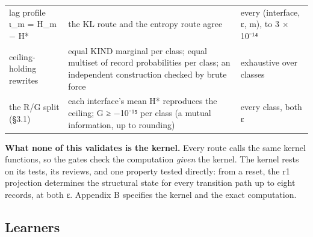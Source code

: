 \documentclass[10pt]{article}
\begin{document}
\begin{longtable}[]{@{}lll@{}}
\begin{minipage}[t]{0.30\columnwidth}
lag profile ι\_m = H\_m − H*\strut
\end{minipage} & \begin{minipage}[t]{0.30\columnwidth}\raggedright
the KL route and the entropy route agree\strut
\end{minipage} & \begin{minipage}[t]{0.30\columnwidth}\raggedright
every (interface, ε, m), to 3 × 10⁻¹⁴\strut
\end{minipage}\tabularnewline
\begin{minipage}[t]{0.30\columnwidth}\raggedright
ceiling-holding rewrites\strut
\end{minipage} & \begin{minipage}[t]{0.30\columnwidth}\raggedright
equal KIND marginal per class; equal multiset of record probabilities per class; an independent construction checked by brute force\strut
\end{minipage} & \begin{minipage}[t]{0.30\columnwidth}\raggedright
exhaustive over classes\strut
\end{minipage}\tabularnewline
\begin{minipage}[t]{0.30\columnwidth}\raggedright
the R/G split (§3.1)\strut
\end{minipage} & \begin{minipage}[t]{0.30\columnwidth}\raggedright
each interface's mean H* reproduces the ceiling; G ≥ −10⁻¹⁵ per class (a mutual information, up to rounding)\strut
\end{minipage} & \begin{minipage}[t]{0.30\columnwidth}\raggedright
every class, both ε\strut
\end{minipage}\tabularnewline
\bottomrule
\end{longtable}

\textbf{What none of this validates is the kernel.} Every route calls the same kernel functions, so the gates check the
computation \emph{given} the kernel. The kernel rests on its tests, its reviews, and one property tested directly: from a
reset, the r1 projection determines the structural state for every transition path up to eight records, at both ε.
Appendix B specifies the kernel and the exact computation.

\hypertarget{learners}{%
\subsection{Learners}\label{learners}}
\end{document}
